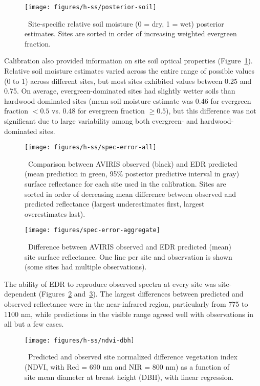 \begin{figure}[ht]
  \centering
  \texttt{[image: figures/h-ss/posterior-soil]}
  \caption{\label{fig:posterior-soil}\
    Site-specific relative soil moisture (0 = dry, 1 = wet) posterior estimates.
    Sites are sorted in order of increasing weighted evergreen fraction.
  }
\end{figure}

Calibration also provided information on site soil optical properties (Figure~\ref{fig:posterior-soil}).
Relative soil moisture estimates varied across the entire range of possible values (0 to 1) across different sites, but most sites exhibited values between 0.25 and 0.75.
On average, evergreen-dominated sites had slightly wetter soils than hardwood-dominated sites
(mean soil moisture estimate was 0.46 for evergreen fraction $< 0.5$ vs. 0.48 for evergreen fraction $\geq 0.5$),
but this difference was not significant due to large variability among both evergreen- and hardwood-dominated sites.

\begin{figure}
  \centering
  \texttt{[image: figures/h-ss/spec-error-all]}
  \caption{\label{fig:spec-error-all}\
    Comparison between AVIRIS observed (black)
    and EDR predicted (mean prediction in green, 95\% posterior predictive interval in gray)
    surface reflectance for each site used in the calibration.
    Sites are sorted in order of decreasing mean difference between observed and predicted reflectance
    (largest underestimates first, largest overestimates last).
  }
\end{figure}

\begin{figure}
  \centering
  \texttt{[image: figures/spec-error-aggregate]}
  \caption{\label{fig:spec-error-aggregate}\
    Difference between AVIRIS observed and EDR predicted (mean) site surface reflectance.
    One line per site and observation is shown (some sites had multiple observations).
  }
\end{figure}

The ability of EDR to reproduce observed spectra at every site was site-dependent (Figures~\ref{fig:spec-error-all} and~\ref{fig:spec-error-aggregate}).
The largest differences between predicted and observed reflectance were in the near-infrared region, particularly from 775 to 1100 nm,
while predictions in the visible range agreed well with observations in all but a few cases.

\begin{figure}[ht]
  \centering
  \texttt{[image: figures/h-ss/ndvi-dbh]}
  \caption{\label{fig:ndvi-dbh}\
    Predicted and observed site normalized difference vegetation index (NDVI, with Red = 690 nm and NIR = 800 nm)
    as a function of site mean diameter at breast height (DBH), with linear regression.
  }
\end{figure}

